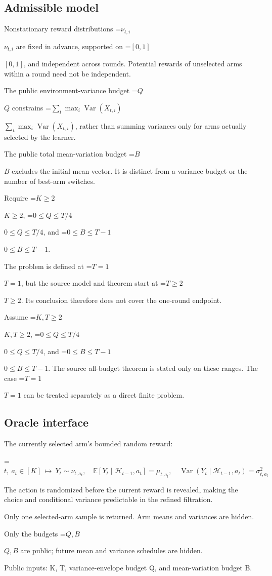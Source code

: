 \documentclass[10pt,a4paper]{article}
\newcommand{\AtlasMath}[1]{\par\begingroup\centering\setbox0=\hbox{$\displaystyle #1$}\ifdim\wd0>1.4\linewidth\typeout{ATLAS WIDE FORMULA: \the\wd0}\fi\ifdim\wd0>\linewidth\resizebox{\linewidth}{!}{\box0}\else\box0\fi\par\endgroup}
\newcommand{\AtlasInlineMath}[1]{\begingroup\setbox0=\hbox{$#1$}\ifdim\wd0>.4\linewidth\endgroup\AtlasMath{#1}\else\endgroup$#1$\fi}
\begin{document}
\subsection{Admissible model}
Nonstationary reward distributions \AtlasInlineMath{\nu_{t,i}} are fixed in advance, supported on \AtlasInlineMath{[0,1]}, and independent across rounds. Potential rewards of unselected arms within a round need not be independent.

The public environment-variance budget \AtlasInlineMath{Q} constrains \AtlasInlineMath{\sum_t\max_i\operatorname{Var}(X_{t,i})}, rather than summing variances only for arms actually selected by the learner.

The public total mean-variation budget \AtlasInlineMath{B} excludes the initial mean vector. It is distinct from a variance budget or the number of best-arm switches.

Require \AtlasInlineMath{K\ge2}, \AtlasInlineMath{0\le Q\le T/4}, and \AtlasInlineMath{0\le B\le T-1}.

The problem is defined at \AtlasInlineMath{T=1}, but the source model and theorem start at \AtlasInlineMath{T\ge2}. Its conclusion therefore does not cover the one-round endpoint.

Assume \AtlasInlineMath{K,T\ge2}, \AtlasInlineMath{0\le Q\le T/4}, and \AtlasInlineMath{0\le B\le T-1}. The source all-budget theorem is stated only on these ranges. The case \AtlasInlineMath{T=1} can be treated separately as a direct finite problem.

\subsection{Oracle interface}
The currently selected arm’s bounded random reward:


\AtlasMath{t,\ a_t\in[K]\ \longmapsto\ Y_t\sim\nu_{t,a_t},\quad\mathbb{E}[Y_t\mid\mathcal{H}_{t-1},a_t]=\mu_{t,a_t},\quad\operatorname{Var}(Y_t\mid\mathcal{H}_{t-1},a_t)=\sigma_{t,a_t}^2}


The action is randomized before the current reward is revealed, making the choice and conditional variance predictable in the refined filtration.

Only one selected-arm sample is returned. Arm means and variances are hidden.

Only the budgets \AtlasInlineMath{Q,B} are public; future mean and variance schedules are hidden.

Public inputs: K, T, variance-envelope budget Q, and mean-variation budget B.
\end{document}
